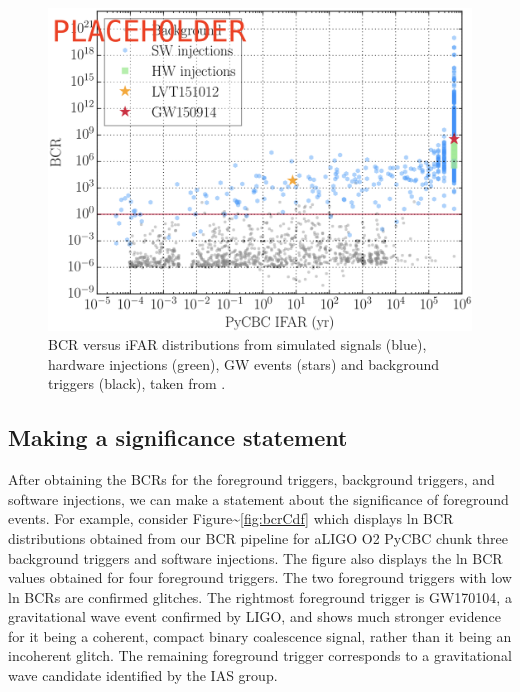 \documentclass[%
 reprint,
 amsmath,amssymb,
 aps,
]{revtex4}
\begin{document}
\begin{figure}[!h]

{\centering \includegraphics[width=0.75\linewidth]{images/bcr_ifar} 

}

\caption[BCR vs iFAR for O1]{BCR versus iFAR distributions from simulated signals (blue), hardware injections (green), GW events (stars) and background triggers (black), taken from \citet{BCR1}.}\label{fig:bcrIfar}
\end{figure}

\hypertarget{making-a-significance-statement}{%
\subsection{Making a significance statement}\label{making-a-significance-statement}}

After obtaining the BCRs for the foreground triggers, background triggers, and software injections, we can make a
statement about the significance of foreground events. For example, consider Figure\textasciitilde\ref{fig:bcrCdf} which displays ln
BCR distributions obtained from our BCR pipeline for aLIGO O2 PyCBC chunk three background triggers and software injections.
The figure also displays the ln BCR values obtained for four foreground triggers. The two foreground triggers with low
ln BCRs are confirmed glitches. The rightmost foreground trigger is GW170104, a gravitational wave event confirmed by
LIGO, and shows much stronger evidence for it being a coherent, compact binary coalescence signal, rather than it being
an incoherent glitch. The remaining foreground trigger corresponds to a gravitational wave candidate identified by the
IAS group.
\end{document}
